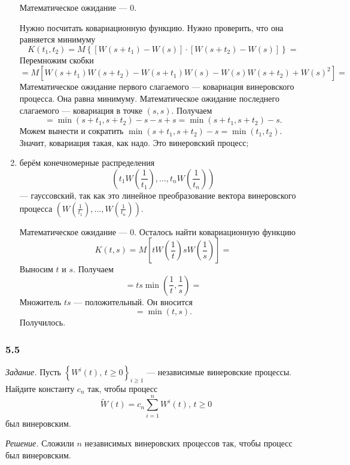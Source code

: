 \begin{enumerate}[label=\alph*)]
  Математическое ожидание --- 0.

  Нужно посчитать ковариационную функцию.
  Нужно проверить, что она равняется минимуму
  $$K \left( t_1, t_2 \right) =
    M \left\{
      \left[ W \left( s + t_1 \right) - W \left( s \right) \right] \cdot
      \left[ W \left( s + t_2 \right) - W \left( s \right) \right] \right\} =$$
  Перемножим скобки
  $$= M \left[
      W \left( s + t_1 \right) W \left( s + t_2 \right) -
      W \left( s + t_1 \right) W \left( s \right) - W \left( s \right) W \left( s + t_2 \right) +
      W \left( s \right)^2 \right] =$$
  Математическое ожидание первого слагаемого --- ковариация винеровского процесса.
  Она равна минимуму.
  Математическое ожидание последнего слагаемого --- ковариация в точке $ \left( s, s \right) $.
  Получаем
  $$= \min \left( s + t_1, s + t_2 \right) - s - s + s =
    \min \left( s + t_1, s + t_2 \right) - s.$$
  Можем вынести и сократить
  $\min \left( s + t_1, s + t_2 \right) - s =
    \min \left( t_1, t_2 \right) $.
  Значит, ковариация такая, как надо.
  Это винеровский процесс;
  \item берём конечномерные распределения
  $$ \left(
      t_1 W \left( \frac{1}{t_1} \right), \dotsc, t_n W \left( \frac{1}{t_n} \right)
    \right) $$
  --- гауссовский, так как это линейное преобразование вектора винеровского процесса
  $ \left( W \left( \frac{1}{t_1} \right), \dotsc, W \left( \frac{1}{t_n} \right) \right) $.

  Математическое ожидание --- 0.
  Осталось найти ковариационную функцию
  $$K \left( t, s \right) =
    M \left[ tW \left( \frac{1}{t} \right) sW \left( \frac{1}{s} \right) \right] =$$
  Выносим $t$ и $s$.
  Получаем
  $$= ts \min \left( \frac{1}{t}, \frac{1}{s} \right) =$$
  Множитель $ts$ --- положительный.
  Он вносится
  $$= \min \left( t, s \right).$$
  Получилось.
\end{enumerate}

\subsubsection*{5.5}

\textit{Задание.}
Пусть $ \left\{ W^i \left( t \right), \, t \geq 0 \right\}_{i \geq 1}$ ---
независимые винеровские процессы.
Найдите константу $c_n$ так, чтобы процесс
$$ \tilde{W} \left( t \right) =
  c_n \sum \limits_{i = 1}^n W^i \left( t \right), \,
  t \geq 0$$
был винеровским.

\textit{Решение.}
Сложили $n$ независимых винеровских процессов так, чтобы процесс был винеровским.

